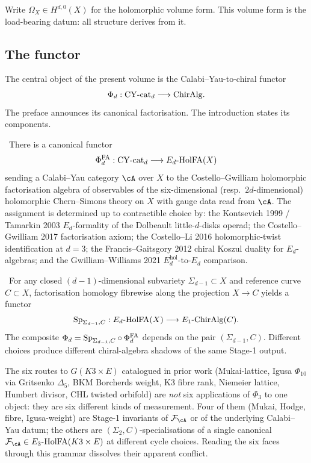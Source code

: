 Write $\Omega_X \in H^{d, 0}(X)$ for the holomorphic volume form. This
volume form is the load-bearing datum: all structure derives from it.

\subsection{The functor}
\label{wn:sec:platonic-intro-functor-wn}

The central object of the present volume is the Calabi--Yau-to-chiral
functor
\[
\Phi_d: \mathrm{CY}\text{-cat}_d \longrightarrow \mathrm{ChirAlg}.
\]
The preface announces its canonical factorisation. The introduction
states its components.

\begin{theorem}
\label{wn:thm:platonic-intro-stage-1}
\ClaimStatusTheorem\
There is a canonical functor
\[
\Phi^{\mathrm{FA}}_d: \mathrm{CY}\text{-cat}_d \longrightarrow E_d\text{-}\mathrm{HolFA}(X)
\]
sending a Calabi--Yau category $\cA$ over $X$ to the
Costello--Gwilliam holomorphic factorisation algebra of observables of
the six-dimensional (resp.\ $2d$-dimensional) holomorphic Chern--Simons
theory on $X$ with gauge data read from $\cA$. The assignment is
determined up to contractible choice by: the Kontsevich 1999 /
Tamarkin 2003 $E_d$-formality of the Dolbeault little-$d$-disks
operad; the Costello--Gwilliam 2017 factorisation axiom; the
Costello--Li 2016 holomorphic-twist identification at $d = 3$; the
Francis--Gaitsgory 2012 chiral Koszul duality for $E_d$-algebras;
and the Gwilliam--Williams 2021 $E_d^{\mathrm{hol}}$-to-$E_d$ comparison.
\end{theorem}

\begin{theorem}
\label{wn:thm:platonic-intro-stage-2}
\ClaimStatusTheorem\
For any closed $(d{-}1)$-dimensional subvariety $\Sigma_{d-1} \subset X$
and reference curve $C \subset X$,
factorisation homology fibrewise along the projection
$X \to C$ yields a functor
\[
\mathrm{Sp}_{\Sigma_{d-1}, C}: E_d\text{-}\mathrm{HolFA}(X) \longrightarrow
E_1\text{-}\mathrm{ChirAlg}(C).
\]
The composite $\Phi_d = \mathrm{Sp}_{\Sigma_{d-1}, C} \circ \Phi^{\mathrm{FA}}_d$
depends on the pair $(\Sigma_{d-1}, C)$. Different choices produce
different chiral-algebra shadows of the same Stage-1 output.
\end{theorem}

The six routes to $G(K3 \times E)$ catalogued in prior work
(Mukai-lattice, Igusa $\Phi_{10}$ via Gritsenko $\Delta_5$, BKM
Borcherds weight, K3 fibre rank, Niemeier lattice, Humbert divisor,
CHL twisted orbifold) are \emph{not} six applications of $\Phi_3$
to one object: they are six different kinds of measurement.
Four of them (Mukai, Hodge, fibre, Igusa-weight) are Stage-1
invariants of $\cF_\cA$ or of the underlying Calabi--Yau datum; the
others are $(\Sigma_2, C)$-specialisations of a single canonical
$\cF_\cA \in E_3\text{-}\HolFA(K3 \times E)$ at different cycle
choices. Reading the six faces through this grammar dissolves
their apparent conflict.

